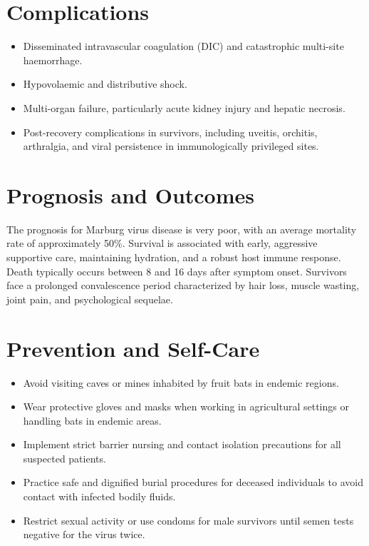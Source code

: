 \section*{Complications}
\begin{itemize}
    \item Disseminated intravascular coagulation (DIC) and catastrophic multi-site haemorrhage.
    \item Hypovolaemic and distributive shock.
    \item Multi-organ failure, particularly acute kidney injury and hepatic necrosis.
    \item Post-recovery complications in survivors, including uveitis, orchitis, arthralgia, and viral persistence in immunologically privileged sites.
\end{itemize}

\section*{Prognosis and Outcomes}
The prognosis for Marburg virus disease is very poor, with an average mortality rate of approximately 50\%. Survival is associated with early, aggressive supportive care, maintaining hydration, and a robust host immune response. Death typically occurs between 8 and 16 days after symptom onset. Survivors face a prolonged convalescence period characterized by hair loss, muscle wasting, joint pain, and psychological sequelae.

\section*{Prevention and Self-Care}
\begin{itemize}
    \item Avoid visiting caves or mines inhabited by fruit bats in endemic regions.
    \item Wear protective gloves and masks when working in agricultural settings or handling bats in endemic areas.
    \item Implement strict barrier nursing and contact isolation precautions for all suspected patients.
    \item Practice safe and dignified burial procedures for deceased individuals to avoid contact with infected bodily fluids.
    \item Restrict sexual activity or use condoms for male survivors until semen tests negative for the virus twice.
\end{itemize}

